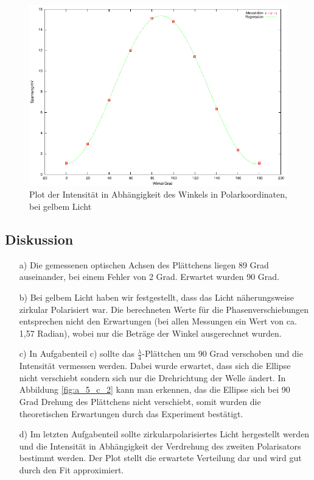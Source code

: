 \documentclass[12pt]{scrartcl}
\begin{document}
\begin{enumerate}
\begin{figure}[H]
\centering
    \includegraphics[scale = 1]{a_5_d.pdf}
  	\caption[Plot der Intensität in Abhängigkeit des Winkels in Polarkoordinaten, bei gelbem Licht]{Plot der Intensität in Abhängigkeit des Winkels in Polarkoordinaten, bei gelbem Licht}
  \label{fig:a_5_d}
\end{figure}
\end{enumerate}
\subsection{Diskussion}
\begin{enumerate}
\item[a)] Die gemessenen optischen Achsen des Plättchens liegen 89 Grad auseinander, bei einem Fehler von 2 Grad. Erwartet wurden 90 Grad.

\item[b)] Bei gelbem Licht haben wir festgestellt, dass das Licht näherungsweise zirkular Polarisiert war. Die berechneten Werte für die Phasenverschiebungen entsprechen nicht den Erwartungen (bei allen Messungen ein Wert von ca. 1,57 Radian), wobei nur die Beträge der Winkel ausgerechnet wurden.

\item[c)] In Aufgabenteil c) sollte das $\frac{\lambda}{4}$-Plättchen um 90 Grad verschoben und die Intensität vermessen werden. Dabei wurde erwartet, dass sich die Ellipse nicht verschiebt sondern sich nur die Drehrichtung der Welle ändert. In Abbildung \ref{fig:a_5_c_2} kann man erkennen, das die Ellipse sich bei 90 Grad Drehung des Plättchens nicht verschiebt, somit wurden die theoretischen Erwartungen durch das Experiment bestätigt.

\item[d)] Im letzten Aufgabenteil sollte zirkularpolarisiertes Licht hergestellt werden und die Intensität in Abhängigkeit der Verdrehung des zweiten Polarisators bestimmt werden. Der Plot stellt die erwartete Verteilung dar und wird gut durch den Fit approximiert.
 
\end{enumerate}
\end{document}
